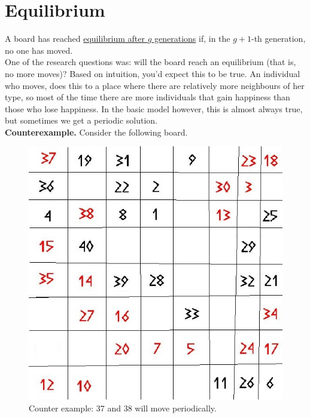 %
\section{Equilibrium}
 A board has reached \underline{equilibrium after $g$ generations} if, in the $g+1$-th generation, no one has moved.\\
One of the research questions was: will the board reach an equilibrium (that is, no more moves)? Based on intuition, you'd expect this to be true. An individual who moves, does this to a place where there are relatively more neighbours of her type, so most of the time there are more individuals that gain happiness than those who lose happiness. In the basic model however, this is almost always true, but sometimes we get a periodic solution.\\
\textbf{Counterexample.} Consider the following board.
\begin{figure}[h!]
\begin{center}
\includegraphics[scale=0.3]{Tegenvoorbeeld/segregation_tegenvb.jpg}
\end{center}
\caption{Counter example: 37 and 38 will move periodically.}\label{counterexample}
\end{figure}
